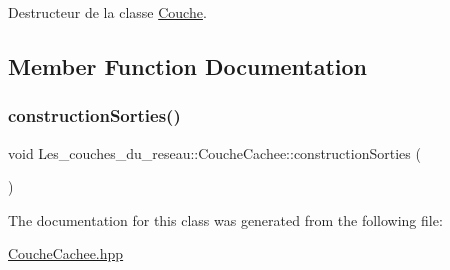 Destructeur de la classe \hyperlink{class_les__couches__du__reseau_1_1_couche}{Couche}. 



\subsection{Member Function Documentation}
\mbox{\label{class_les__couches__du__reseau_1_1_couche_cachee_aa94b46e05fe06440357e805da89a463d}} 
\subsubsection{\texorpdfstring{construction\+Sorties()}{constructionSorties()}}
{\footnotesize\ttfamily void Les\+\_\+couches\+\_\+du\+\_\+reseau\+::\+Couche\+Cachee\+::construction\+Sorties (\begin{DoxyParamCaption}{ }\end{DoxyParamCaption})}



The documentation for this class was generated from the following file\+:\begin{DoxyCompactItemize}
\item 
\hyperlink{_couche_cachee_8hpp}{Couche\+Cachee.\+hpp}\end{DoxyCompactItemize}
